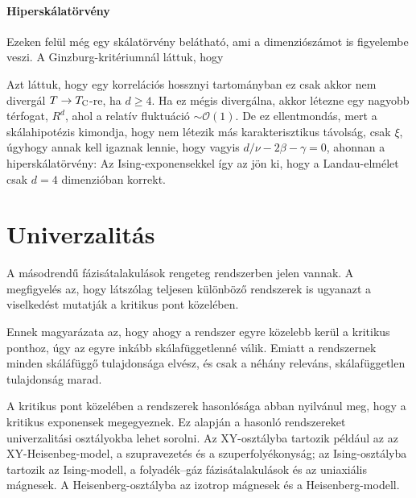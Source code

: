    \paragraph{Hiperskálatörvény}
    
    Ezeken felül még egy skálatörvény belátható, ami a dimenziószámot is figyelembe veszi. A Ginzburg-kritériumnál láttuk, hogy 
    
    Azt láttuk, hogy egy korrelációs hossznyi tartományban ez csak akkor nem divergál $T\to T_\text{C}$-re, ha $d\ge 4$. Ha ez mégis divergálna, akkor létezne egy nagyobb térfogat, $R^d$, ahol a relatív fluktuáció $\sim\mathcal{O}(1)$. De ez ellentmondás, mert a skálahipotézis kimondja, hogy nem létezik más karakterisztikus távolság, csak $\xi$, úgyhogy annak kell igaznak lennie, hogy 
    vagyis $d/\nu-2\beta-\gamma=0$, ahonnan a hiperskálatörvény:
    Az Ising-exponensekkel így az jön ki, hogy a Landau-elmélet csak $d=4$ dimenzióban korrekt.
    
 
 \section{Univerzalitás}\label{ss:B10-univerzalitas}
  
  A másodrendű fázisátalakulások rengeteg rendszerben jelen vannak. A megfigyelés az, hogy látszólag teljesen különböző rendszerek is ugyanazt a viselkedést mutatják a kritikus pont közelében. 
  
  Ennek magyarázata az, hogy ahogy a rendszer egyre közelebb kerül a kritikus ponthoz, úgy az egyre inkább skálafüggetlenné válik. Emiatt a rendszernek minden skáláfüggő tulajdonsága elvész, és csak a néhány releváns, skálafüggetlen tulajdonság marad. 
  
  A kritikus pont közelében a rendszerek hasonlósága abban nyilvánul meg, hogy a kritikus exponensek megegyeznek. Ez alapján a hasonló rendszereket univerzalitási osztályokba lehet sorolni. Az XY-osztályba tartozik például az az XY-Heisenbeg-model, a szupravezetés és a szuperfolyékonyság; az Ising-osztályba tartozik az Ising-modell, a folyadék--gáz fázisátalakulások és az uniaxiális mágnesek. A Heisenberg-osztályba az izotrop mágnesek és a Heisenberg-modell. 
  
  
  